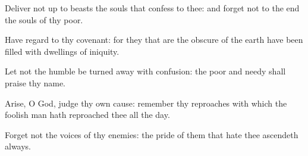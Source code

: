 \item Deliver not up to beasts the souls that confess to thee: and forget not to the end the souls of thy poor.
\item Have regard to thy covenant: for they that are the obscure of the earth have been filled with dwellings of iniquity.
\item Let not the humble be turned away with confusion: the poor and needy shall praise thy name.
\item Arise, O God, judge thy own cause: remember thy reproaches with which the foolish man hath reproached thee all the day.
\item Forget not the voices of thy enemies: the pride of them that hate thee ascendeth always.